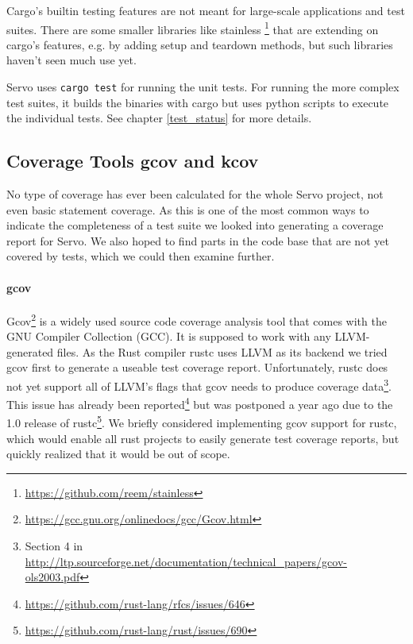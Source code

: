 \documentclass{scrartcl}
\begin{document}
Cargo's builtin testing features are not meant for large-scale applications and test suites. There are some smaller libraries like stainless \footnote{\url{https://github.com/reem/stainless}} that are extending on cargo's features, e.g. by adding setup and teardown methods, but such libraries haven't seen much use yet. 

Servo uses \texttt{cargo test} for running the unit tests. For running the more complex test suites, it builds the binaries with cargo but uses python scripts to execute the individual tests. See chapter \ref{test_status} for more details.


\subsection{Coverage Tools gcov and kcov}

No type of coverage has ever been calculated for the whole Servo project, not even basic statement coverage. As this is one of the most common ways to indicate the completeness of a test suite we looked into generating a coverage report for Servo. We also hoped to find parts in the code base that are not yet covered by tests, which we could then examine further. 

\paragraph{gcov}
Gcov\footnote{\url{https://gcc.gnu.org/onlinedocs/gcc/Gcov.html}} is a widely used source code coverage analysis tool that comes with the GNU Compiler Collection (GCC). It is supposed to work with any LLVM-generated files. As the Rust compiler rustc uses LLVM as its backend we tried gcov first to generate a useable test coverage report. Unfortunately, rustc does not yet support all of LLVM's flags that gcov needs to produce coverage data\footnote{Section 4 in \url{http://ltp.sourceforge.net/documentation/technical_papers/gcov-ols2003.pdf}}. This issue has already been reported\footnote{\url{https://github.com/rust-lang/rfcs/issues/646}} but was postponed a year ago due to the 1.0 release of rustc\footnote{\url{https://github.com/rust-lang/rust/issues/690}}. We briefly considered implementing gcov support for rustc, which would enable all rust projects to easily generate test coverage reports, but quickly realized that it would be out of scope.
\end{document}
